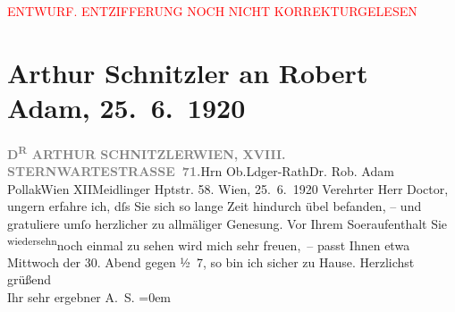 
\begin{center}
            \textcolor{red}{ENTWURF. ENTZIFFERUNG NOCH NICHT KORREKTURGELESEN}
                      \end{center}
            
               \section[Arthur Schnitzler an Robert Adam, 25. 6. 1920]{ Arthur Schnitzler an Robert Adam, 25. 6. 1920}\nopagebreak{}\rehead{ }\begin{ledgroupsized}[t]{13cm}\normalsize\beginnumbering{} \toendnotes[C]{\smallbreak\pagebreak[2]} 
\pstart{}{\pb}\textcolor{gray}{\textbf{D\textsuperscript{R} ARTHUR SCHNITZLER}}\pend{}\pstart{}\textcolor{gray}{\textbf{WIEN, XVIII. STERNWARTESTRASSE 71.}}\pend{}{\bigskip}\pstart{}Hrn Ob.Ldger-Rath\pend{}\pstart{}Dr. Rob. Adam Pollak\pend{}\pstart{}Wien XII\pend{}\pstart{}Meidlinger Hptstr. 58.\pend{}{\bigskip}\pstart
           \raggedleft{}{\pb}Wien, 25. 6. 1920\pend
           \pstart{}Verehrter Herr Doctor,\pend\pstart
           ungern erfahre ich, dſs Sie sich so lange Zeit hindurch übel befanden, – und
                    gratuliere umſo herzlicher zu allmäliger Genesung. Vor Ihrem So{\geminationm}eraufenthalt Sie \substVorne{}\textsuperscript{wiedersehn}{\allowbreak}\substDazwischen{}noch einmal\substHinten{} zu sehen wird mich sehr freuen, – passt Ihnen etwa Mittwoch der
                        30.{ }Abend gegen ½ 7, so bin ich sicher zu Hause.\pend
           \pstart
           Herzlichst grüßend{\\[\baselineskip]}Ihr sehr ergebner \spacefill\mbox{A. S.}\pend
           \leftskip=0em{}\endnumbering{}\end{ledgroupsized}  \newcommand{\dateiname}{L02344}\newcommand{\titel}{Arthur Schnitzler an Robert Adam, 25. 6. 1920}\newcommand{\editorInnen}{Martin Anton Müller und Gerd-Hermann Susen}
      